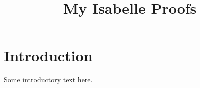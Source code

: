 \documentclass{article}
\begin{document}
\title{My Isabelle Proofs}
\maketitle

\section{Introduction}
Some introductory text here.


\end{document}
